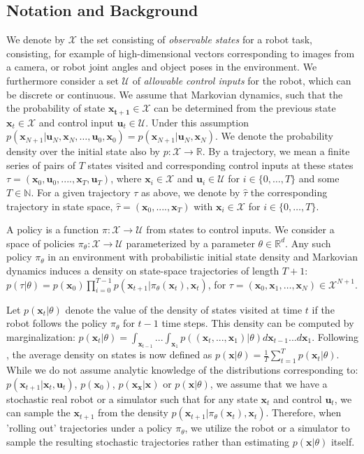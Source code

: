 \documentclass[10pt, conference]{ieeeconf}      %
\newcommand{\bu}{\mathbf{u}}
\newcommand{\bx}{\mathbf{x}}
\begin{document}
\subsection{Notation and Background}
We denote by $\mathcal{X}$ the set consisting of \emph{observable states} for a robot task, consisting, for example of
high-dimensional vectors corresponding to images from a camera, or robot joint angles and object poses in the environment.
We furthermore consider a set $\mathcal{U}$ of \emph{allowable control inputs} for the robot, which can be discrete or
continuous. We assume that Markovian dynamics, such that the the probability of state $\mathbf{x_{t+1}}\in
\mathcal{X}$ can be determined from the previous state $\mathbf{x}_t\in\mathcal{X}$ and control input $\mathbf{u}_t\in
\mathcal{U}$. Under this assumption $p(\bx_{N+1}|\bu_{N},\bx_{N}, \ldots, \bu_{0}, \bx_{0})=p(\bx_{N+1}|\bu_{N}, \bx_N)$.  
We denote the probability density over the initial state also by $p:\mathcal{X}\to
\mathbb{R}$. By a trajectory, we mean a finite series of pairs of $T$ states visited and corresponding
control inputs at these states $\tau = (\mathbf{x}_0,\mathbf{u}_0, ...., \mathbf{x}_T,\mathbf{u}_T)$, where $\bx_i\in \mathcal{X}$
and $\bu_i\in \mathcal{U}$ for $i\in \{0, \ldots, T\}$ and some $T\in \mathbb{N}$.  
For a given trajectory $\tau$ as above, we denote by $\hat{\tau}$ the corresponding trajectory in state space,
$\hat{\tau} = (\bx_0,....,\bx_T)$ with $\bx_i\in\mathcal{X}$ for $i\in \{0, \ldots, T\}$.


A policy is a function $\pi: \mathcal{X} \to \mathcal{U}$ from states to control inputs. 
We consider a space of policies $\pi_{\theta}:\mathcal{X}\to \mathcal{U}$ parameterized by a
parameter $\theta\in \mathbb{R}^d$. Any such policy $\pi_{\theta}$ in an environment with probabilistic initial state density and Markovian dynamics
induces a density on state-space trajectories of length $T+1$: $p(\tau | \theta)=
p(\bx_0)\prod_{i=0}^{T-1}p(\bx_{t+1}|\pi_{\theta}(\bx_t),\bx_t)$, for $\tau = (\bx_0, \bx_1, \ldots, \bx_N)\in
\mathcal{X}^{N+1}$.

Let $p(\bx_t|\theta)$ denote the value of the density of states visited at time $t$ if the robot follows the policy
$\pi_{\theta}$ for $t-1$ time steps. This density can be computed by marginalization: $p(\bx_t|\theta) =
\int_{\bx_{t-1}}...\int_{\bx_1} p((\bx_t,...,\bx_1)|\theta) d\bx_{t-1}...d\bx_1$. Following \cite{ross2010reduction},
the average density on states is now defined as $p(\bx|\theta) = \frac{1}{T} \sum^T_{t=1} p(\bx_t|\theta)$.
While we do not assume analytic knowledge of the distributions corresponding to: $p(\bx_{t+1}|\bx_t,\bu_t)$, $p(\bx_0)$, $p(\bx_{\bx}|
\bx)$ or $p(\bx|\theta)$, we assume that we have a stochastic real robot or a simulator such that for any state
$\bx_t$ and control $\bu_t$, we can sample the $\bx_{t+1}$ from the density $p(\bx_{t+1}|\pi_{\theta}(\bx_t),\bx_t)$. 
Therefore, when 'rolling out' trajectories under a policy
$\pi_{\theta}$, we utilize the robot or a simulator to sample the resulting stochastic trajectories rather than
estimating $p(\bx|\theta)$ itself.
\end{document}
